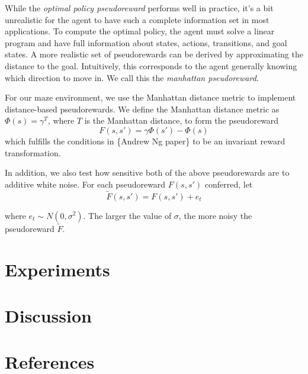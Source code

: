 \documentclass[notitlepage]{report}
\begin{document}
While the \textit{optimal policy pseudoreward} performs well in practice, it's a bit unrealistic for the agent to have such a complete information set in most applications. To compute the optimal policy, the agent must solve a linear program and have full information about states, actions, transitions, and goal states. A more realistic set of pseudorewards can be derived by approximating the distance to the goal. Intuitively, this corresponds to the agent generally knowing which direction to move in. We call this the \textit{manhattan pseudoreward}.

For our maze environment, we use the Manhattan distance metric to implement distance-based pseudorewards. We define the Manhattan distance metric as $\Phi(s) = \gamma^T$, where $T$ is the Manhattan distance, to form the pseudoreward
\begin{equation}
F(s, s') = \gamma \Phi(s') - \Phi(s)
\end{equation} 
which fulfills the conditions in \{Andrew Ng paper\} to be an invariant reward transformation. 

In addition, we also test how sensitive both of the above pseudorewards are to additive white noise. For each pseudoreward $F(s, s')$ conferred, let
\begin{equation}
\tilde{F}(s, s') = F(s, s') + e_t
\end{equation} 

\noindent where $e_t \sim N(0, \sigma^2)$. The larger the value of $\sigma$, the more noisy the pseudoreward $\tilde{F}$.  

\section*{Experiments}




\section*{Discussion}

\section*{References}
\end{document}
